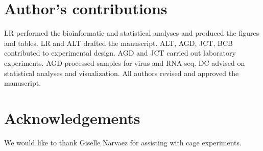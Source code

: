 \documentclass{bmcart}
\begin{document}
\begin{linenumbers}
\begin{backmatter}
\section*{Author's contributions}
  LR performed the bioinformatic and statistical analyses and produced the figures and tables. LR and ALT drafted the manuscript. ALT, AGD, JCT, BCB contributed to experimental design. AGD and JCT carried out laboratory experiments. AGD processed samples for virus and RNA-seq. DC advised on statistical analyses and visualization. All authors revised and approved the manuscript.
    
\section*{Acknowledgements}
  We would like to thank Giselle Narvaez for assisting with cage experiments.
  





\end{backmatter}
\end{linenumbers}
\end{document}
